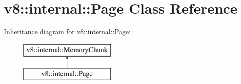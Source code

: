 \hypertarget{classv8_1_1internal_1_1_page}{}\section{v8\+:\+:internal\+:\+:Page Class Reference}
\label{classv8_1_1internal_1_1_page}
Inheritance diagram for v8\+:\+:internal\+:\+:Page\+:\begin{figure}[H]
\begin{center}
\leavevmode
\includegraphics[height=2.000000cm]{classv8_1_1internal_1_1_page}
\end{center}
\end{figure}
